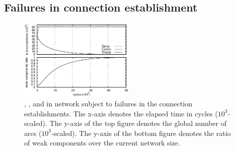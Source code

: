 \subsection{Failures in connection establishment}
\label{subsec:degeneration}

\begin{figure}
  \centering \includegraphics[width=0.49\textwidth]{img/degen.eps}
  \caption{\label{fig:degeneration}\CYCLON, \SCAMP, and \SPRAY in network
    subject to failures in the connection establishments. The x-axis denotes
    the elapsed time in cycles ($10^3$-scaled). The y-axis of the top figure
    denotes the global number of arcs ($10^3$-scaled). The y-axis of the bottom
    figure denotes the ratio of weak components over the current network size.}
\end{figure}

